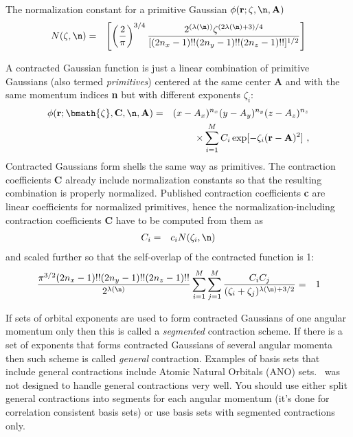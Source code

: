 \documentclass[10pt]{article}
\begin{document}
The normalization constant for a primitive Gaussian $\phi ({\bf r}; \zeta, \n, {\bf A})$
\begin{eqnarray}
N(\zeta,\n) & = & \left[ \left(\frac{2}{\pi}\right)^{3/4}\frac{2^{(\lambda(\n))}\zeta^{(2\lambda(\n)+3)/4}}
                {[(2n_x-1)!!(2n_y-1)!!(2n_z-1)!!]^{1/2}} \right]
\end{eqnarray}

A contracted Gaussian function is just a linear combination of primitive Gaussians (also termed {\em primitives})
centered at the same center {\bf A} and with the same momentum indices {\bf n}
but with different exponents $\zeta_i$:
\begin{eqnarray}
\phi ({\bf r}; \bmath{\zeta}, {\bf C}, \n, {\bf A}) & = & (x - A_x)^{n_x} (y - A_y)^{n_y} (z - A_z)^{n_z} \nonumber \\
& & \times \sum_{i=1}^M C_i \exp [-\zeta_i ({\bf r}-{\bf A})^2]\ ,
\end{eqnarray}
Contracted Gaussians form shells the same way as primitives.
The contraction coefficients {\bf C} already include normalization constants so that the resulting combination
is properly normalized. Published contraction coefficients {\bf c} are linear coefficients for normalized primitives,
hence the normalization-including contraction coefficients {\bf C} have to be computed from them as
\begin{eqnarray} \label{eq:C1}
C_i & = & c_i N(\zeta_i,\n)
\end{eqnarray}
and scaled further so that the self-overlap of the contracted function is 1:
\begin{eqnarray} \label{eq:C2}
\frac{\pi^{3/2} (2n_x-1)!!(2n_y-1)!!(2n_z-1)!!}{2^{\lambda(\n)}}
\sum_{i=1}^M \sum_{j=1}^M \frac{C_i C_j }{(\zeta_i+\zeta_j)^{\lambda(\n)+3/2}} & = & 1
\end{eqnarray}

If sets of orbital exponents are used to form contracted Gaussians of one angular momentum only
then this is called a {\em segmented} contraction scheme. If there is a set of exponents that forms
contracted Gaussians of several angular momenta then such scheme is called {\em general} contraction.
Examples of basis sets that include general contractions include Atomic Natural Orbitals (ANO) sets.
\LIBINT\ was not designed to handle general contractions very well. You should use either split general contractions
into segments for each angular momentum (it's done for correlation consistent basis sets)
or use basis sets with segmented contractions only.
\end{document}
